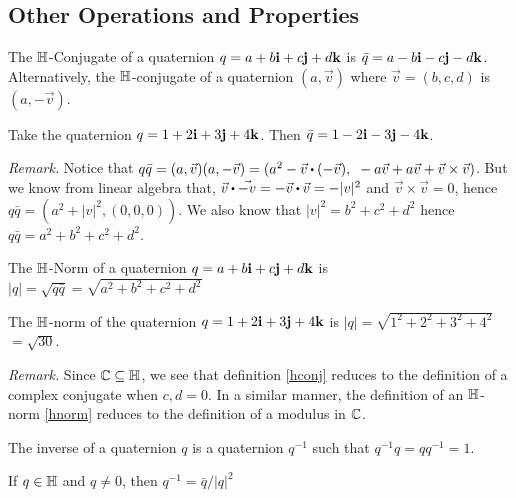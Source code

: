 \subsection{Other Operations and Properties}

\begin{definition}[$\HH$-Conjugate] \label{hconj}
	The $\HH$-Conjugate of a quaternion $q = a + b\textbf{i} + c\textbf{j} + d\textbf{k}$ is $\bar{q} = a - b\textbf{i} - c\textbf{j} - d\textbf{k}$. Alternatively, the $\HH$-conjugate of a quaternion $(a,\vec{v})$ where $\vec{v} = (b,c,d)$ is $(a,-\vec{v})$.
\end{definition}

\begin{ex}
	Take the quaternion $q = 1+2\textbf{i}+3\textbf{j}+4\textbf{k}$. Then $\bar{q} = 1-2\textbf{i}-3\textbf{j}-4\textbf{k}$.
\end{ex}

\textit{Remark.} Notice that $q\bar{q} = (a,\vec{v})(a,-\vec{v}) = (a^2-\vec{v}\bigcdot(-\vec{v}), \text{ } -a\vec{v}+a\vec{v}+\vec{v}\times\vec{v})$. But we know from linear algebra that, $\vec{v}\bigcdot\vec{-v} = -\vec{v}\bigcdot\vec{v} = -|v|^2$ and $\vec{v}\times\vec{v} = 0$, hence $q\bar{q} = (a^2+|v|^2,(0,0,0))$. We also know that $|v|^2 = b^2+c^2+d^2$ hence $q\bar{q} = a^2+b^2+c^2+d^2$.

\begin{definition}[$\HH$-Norm] \label{hnorm}
	The $\HH$-Norm of a quaternion $q = a + b\textbf{i} + c\textbf{j} + d\textbf{k}$ is $|q| = \sqrt{q\bar{q}} = \sqrt{a^2+b^2+c^2+d^2}$
\end{definition}

\begin{ex}
	The $\HH$-norm of the quaternion $q = 1 + 2\textbf{i} + 3\textbf{j} + 4\textbf{k}$ is $|q| = \sqrt{1^2 + 2^2 + 3^2 + 4^2}$ $ = \sqrt{30}$.
\end{ex}
	
	\textit{Remark.} Since $\operatorname{\mathbb{C}} \subseteq \operatorname{\mathbb{H}}$, we see that definition \ref{hconj} reduces to the definition of a complex conjugate when $c,d = 0$. In a similar manner, the definition of an $\HH$-norm \ref{hnorm} reduces to the definition of a modulus in $\operatorname{\mathbb{C}}$.

\begin{definition}[Inverse]
	The inverse of a quaternion $q$ is a quaternion $q^{-1}$ such that $q^{-1}q = qq^{-1} = 1$.
\end{definition}

\begin{theorem} \label{quatinv}
	If $q \in \operatorname{\mathbb{H}}$ and $q\neq 0$, then $q^{-1} = \bar{q}/|q|^2$
\end{theorem}

